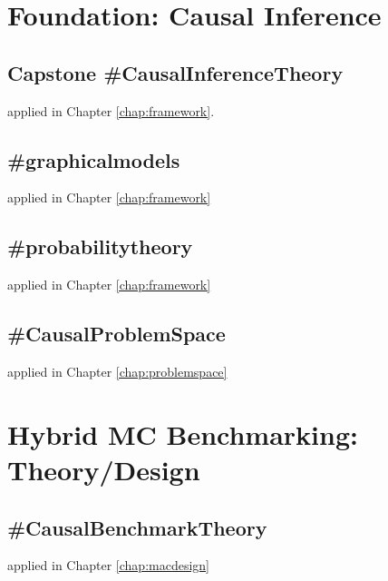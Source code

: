 \documentclass[../main.tex]{subfiles}
\begin{document}
\section{Foundation: Causal Inference}

\subsection*{\textbf{Capstone \#CausalInferenceTheory}}
\label{lo:CausalInferenceTheory}

applied in Chapter \ref{chap:framework}.


\subsection*{\textbf{\#graphicalmodels}}
\label{lo:graphicalmodels}

applied in Chapter \ref{chap:framework}


\subsection*{\textbf{\#probabilitytheory}}
\label{lo:probabilitytheory}

applied in Chapter \ref{chap:framework}


\subsection*{\textbf{\#CausalProblemSpace}}
\label{lo:CausalProblemSpace}

applied in Chapter \ref{chap:problemspace}


\section{Hybrid MC Benchmarking: Theory/Design}

\subsection*{\textbf{\#CausalBenchmarkTheory}}
\label{lo:CausalBenchmarkTheory}

applied in Chapter \ref{chap:macdesign}
\end{document}
